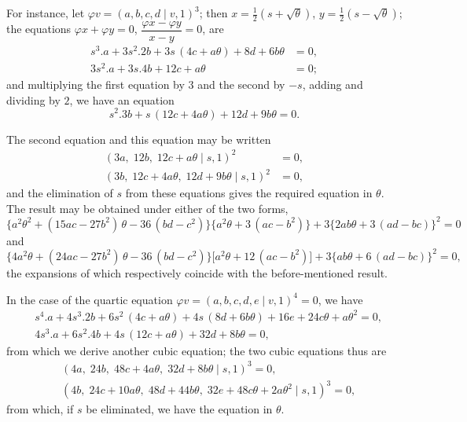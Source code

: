 \documentclass[11pt]{article}
\newcommand{\Cdel}{\mid}
\begin{document}
\medskip

\noindent For instance, let $\varphi v = (a, b, c, d \Cdel v, 1)^3$; then $x = \tfrac{1}{2}(s + \sqrt{\theta})$, $y = \tfrac{1}{2}(s - \sqrt{\theta})$; the equations $\varphi x + \varphi y = 0$, $\dfrac{\varphi x - \varphi y}{x - y} = 0$, are
\[
\begin{aligned}
   s^3 . a + 3 s^2 . 2 b + 3 s\,(4 c + a\theta) + 8 d + 6 b\theta &= 0,\\
   3 s^2 . a + 3 s . 4 b + 12 c + a\theta &= 0;
\end{aligned}
\]
and multiplying the first equation by $3$ and the second by $-s$, adding and dividing by $2$, we have an equation
\[
   s^2 . 3 b + s\,(12 c + 4 a\theta) + 12 d + 9 b\theta = 0.
\]

\medskip

\noindent The second equation and this equation may be written
\[
\begin{aligned}
   (3 a,\; 12 b,\; 12 c + a\theta \Cdel s, 1)^2 &= 0,\\
   (3 b,\; 12 c + 4 a\theta,\; 12 d + 9 b\theta \Cdel s, 1)^2 &= 0,
\end{aligned}
\]
and the elimination of $s$ from these equations gives the required equation in $\theta$. The result may be obtained under either of the two forms,
\[
   \bigl\{a^2\theta^2 + (15 a c - 27 b^2)\,\theta - 36\,(bd - c^2)\bigr\}\bigl\{a^2\theta + 3\,(ac - b^2)\bigr\} + 3\bigl\{2 a b\theta + 3\,(ad - bc)\bigr\}^2 = 0
\]
and
\[
   \bigl\{4 a^2\theta + (24 a c - 27 b^2)\,\theta - 36\,(bd - c^2)\bigr\}\bigl[a^2\theta + 12\,(ac - b^2)\bigr] + 3\bigl\{a b\theta + 6\,(ad - bc)\bigr\}^2 = 0,
\]
the expansions of which respectively coincide with the before-mentioned result.

\medskip

\noindent In the case of the quartic equation $\varphi v = (a, b, c, d, e \Cdel v, 1)^4 = 0$, we have
\[
\begin{aligned}
   & s^4 . a + 4 s^3 . 2 b + 6 s^2\,(4 c + a\theta) + 4 s\,(8 d + 6 b\theta) + 16 e + 24 c\theta + a\theta^2 = 0,\\
   & 4 s^3 . a + 6 s^2 . 4 b + 4 s\,(12 c + a\theta) + 32 d + 8 b\theta = 0,
\end{aligned}
\]
from which we derive another cubic equation; the two cubic equations thus are
\[
\begin{aligned}
   & (4 a,\; 24 b,\; 48 c + 4 a\theta,\; 32 d + 8 b\theta \Cdel s, 1)^3 = 0,\\
   & (4 b,\; 24 c + 10 a\theta,\; 48 d + 44 b\theta,\; 32 e + 48 c\theta + 2 a\theta^2 \Cdel s, 1)^3 = 0,
\end{aligned}
\]
from which, if $s$ be eliminated, we have the equation in $\theta$.
\end{document}

